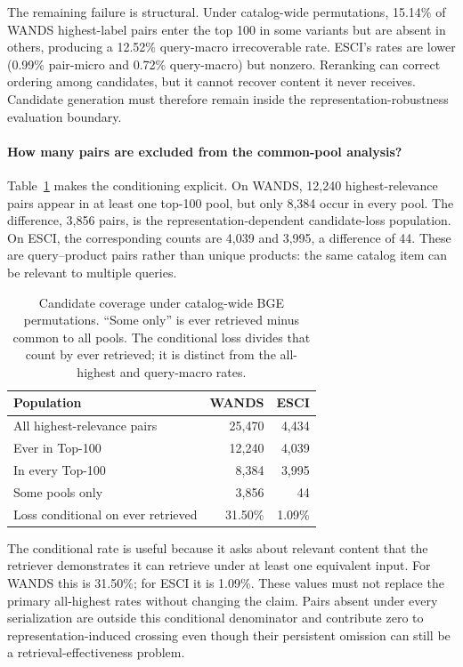 The remaining failure is structural. Under catalog-wide permutations, 15.14\% of WANDS highest-label pairs enter the top 100 in some variants but are absent in others, producing a 12.52\% query-macro irrecoverable rate. ESCI's rates are lower (0.99\% pair-micro and 0.72\% query-macro) but nonzero. Reranking can correct ordering among candidates, but it cannot recover content it never receives. Candidate generation must therefore remain inside the representation-robustness evaluation boundary.


\paragraph{How many pairs are excluded from the common-pool analysis?}
Table~\ref{tab:coverage} makes the conditioning explicit. On WANDS, 12,240 highest-relevance pairs appear in at least one top-100 pool, but only 8,384 occur in every pool. The difference, 3,856 pairs, is the representation-dependent candidate-loss population. On ESCI, the corresponding counts are 4,039 and 3,995, a difference of 44. These are query--product pairs rather than unique products: the same catalog item can be relevant to multiple queries.

\begin{table}[t]
\caption{Candidate coverage under catalog-wide BGE permutations. ``Some only'' is ever retrieved minus common to all pools. The conditional loss divides that count by ever retrieved; it is distinct from the all-highest and query-macro rates.}
\label{tab:coverage}\centering\small
\begin{tabular}{lrr}\toprule
Population & WANDS & ESCI\\\midrule
All highest-relevance pairs & 25,470 & 4,434\\
Ever in Top-100 & 12,240 & 4,039\\
In every Top-100 & 8,384 & 3,995\\
Some pools only & 3,856 & 44\\
Loss conditional on ever retrieved & 31.50\% & 1.09\%\\\bottomrule
\end{tabular}
\end{table}

The conditional rate is useful because it asks about relevant content that the retriever demonstrates it can retrieve under at least one equivalent input. For WANDS this is 31.50\%; for ESCI it is 1.09\%. These values must not replace the primary all-highest rates without changing the claim. Pairs absent under every serialization are outside this conditional denominator and contribute zero to representation-induced crossing even though their persistent omission can still be a retrieval-effectiveness problem.

